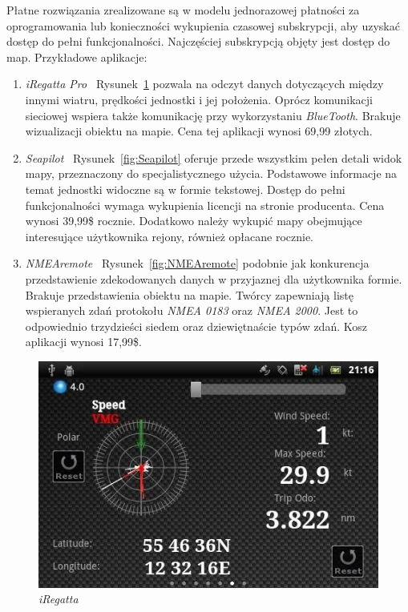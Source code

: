 \documentclass[skorowidz,skroty]{dyplomWEZUT}
\begin{document}
Płatne rozwiązania zrealizowane są w modelu jednorazowej płatności za oprogramowania lub konieczności wykupienia czasowej subskrypcji, aby uzyskać dostęp do pełni funkcjonalności. Najczęściej subskrypcją objęty jest dostęp do map. Przykładowe aplikacje:
\begin{enumerate}

\item \textit{iRegatta Pro} \cite{iRegatta} ~Rysunek~\ref{fig:iRegatta} pozwala na odczyt danych dotyczących między innymi wiatru, prędkości jednostki i jej położenia. Oprócz komunikacji sieciowej wspiera także komunikację przy wykorzystaniu \textit{BlueTooth}. Brakuje wizualizacji obiektu na mapie. Cena tej aplikacji wynosi 69,99 złotych.

\item \textit{Seapilot} \cite{Seapilot} ~Rysunek~\ref{fig:Seapilot} oferuje przede wszystkim pełen detali widok mapy, przeznaczony do specjalistycznego użycia. Podstawowe informacje na temat jednostki widoczne są w formie tekstowej. Dostęp do pełni funkcjonalności wymaga wykupienia licencji na stronie producenta. Cena wynosi 39,99\$ rocznie. Dodatkowo należy wykupić mapy obejmujące interesujące użytkownika rejony, również opłacane rocznie.

\item \textit{NMEAremote} \cite{NMEAremote} ~Rysunek~\ref{fig:NMEAremote} podobnie jak konkurencja przedstawienie zdekodowanych danych w przyjaznej dla użytkownika formie. Brakuje przedstawienia obiektu na mapie. Twórcy zapewniają listę wspieranych zdań protokołu \textit{NMEA 0183} oraz \textit{NMEA 2000}. Jest to odpowiednio trzydzieści siedem oraz dziewiętnaście typów zdań. Kosz aplikacji wynosi 17,99\$.  

\end{enumerate}

\begin{figure}[H]
  \centering
    \includegraphics[scale=1.0]{graphic/iRegatta}
    \caption{\textit{iRegatta}}
    \label{fig:iRegatta}
\end{figure}
\end{document}

